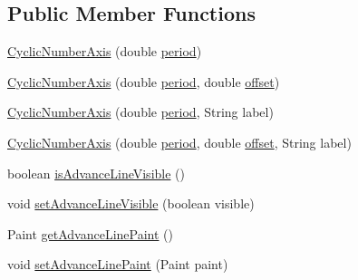\subsection*{Public Member Functions}
\begin{DoxyCompactItemize}
\item 
\mbox{\hyperlink{classorg_1_1jfree_1_1chart_1_1axis_1_1_cyclic_number_axis_a58586a50dcc2ea1e3ae036a81ca922df}{Cyclic\+Number\+Axis}} (double \mbox{\hyperlink{classorg_1_1jfree_1_1chart_1_1axis_1_1_cyclic_number_axis_a3c65906e3e4963a1cf1f9ade9237ea7c}{period}})
\item 
\mbox{\hyperlink{classorg_1_1jfree_1_1chart_1_1axis_1_1_cyclic_number_axis_a3f11bea78e2b37599e9f64eda16446bd}{Cyclic\+Number\+Axis}} (double \mbox{\hyperlink{classorg_1_1jfree_1_1chart_1_1axis_1_1_cyclic_number_axis_a3c65906e3e4963a1cf1f9ade9237ea7c}{period}}, double \mbox{\hyperlink{classorg_1_1jfree_1_1chart_1_1axis_1_1_cyclic_number_axis_a6e933c67b716e70d85f4438740fce7b1}{offset}})
\item 
\mbox{\hyperlink{classorg_1_1jfree_1_1chart_1_1axis_1_1_cyclic_number_axis_aa33b321502007012f26758853ecd7106}{Cyclic\+Number\+Axis}} (double \mbox{\hyperlink{classorg_1_1jfree_1_1chart_1_1axis_1_1_cyclic_number_axis_a3c65906e3e4963a1cf1f9ade9237ea7c}{period}}, String label)
\item 
\mbox{\hyperlink{classorg_1_1jfree_1_1chart_1_1axis_1_1_cyclic_number_axis_a24efabf771011f66cbc83b70fded1f83}{Cyclic\+Number\+Axis}} (double \mbox{\hyperlink{classorg_1_1jfree_1_1chart_1_1axis_1_1_cyclic_number_axis_a3c65906e3e4963a1cf1f9ade9237ea7c}{period}}, double \mbox{\hyperlink{classorg_1_1jfree_1_1chart_1_1axis_1_1_cyclic_number_axis_a6e933c67b716e70d85f4438740fce7b1}{offset}}, String label)
\item 
boolean \mbox{\hyperlink{classorg_1_1jfree_1_1chart_1_1axis_1_1_cyclic_number_axis_a103a095ff50eda5343ea00f92be6b50e}{is\+Advance\+Line\+Visible}} ()
\item 
void \mbox{\hyperlink{classorg_1_1jfree_1_1chart_1_1axis_1_1_cyclic_number_axis_a94a15f3f122f424a87536ab8248c141c}{set\+Advance\+Line\+Visible}} (boolean visible)
\item 
Paint \mbox{\hyperlink{classorg_1_1jfree_1_1chart_1_1axis_1_1_cyclic_number_axis_ae59b43a8a2e73bee9de32a44c7267d63}{get\+Advance\+Line\+Paint}} ()
\item 
void \mbox{\hyperlink{classorg_1_1jfree_1_1chart_1_1axis_1_1_cyclic_number_axis_a7ddc0787150a87aa620dadbd9a3e9515}{set\+Advance\+Line\+Paint}} (Paint paint)
\item 

\end{DoxyCompactItemize}
